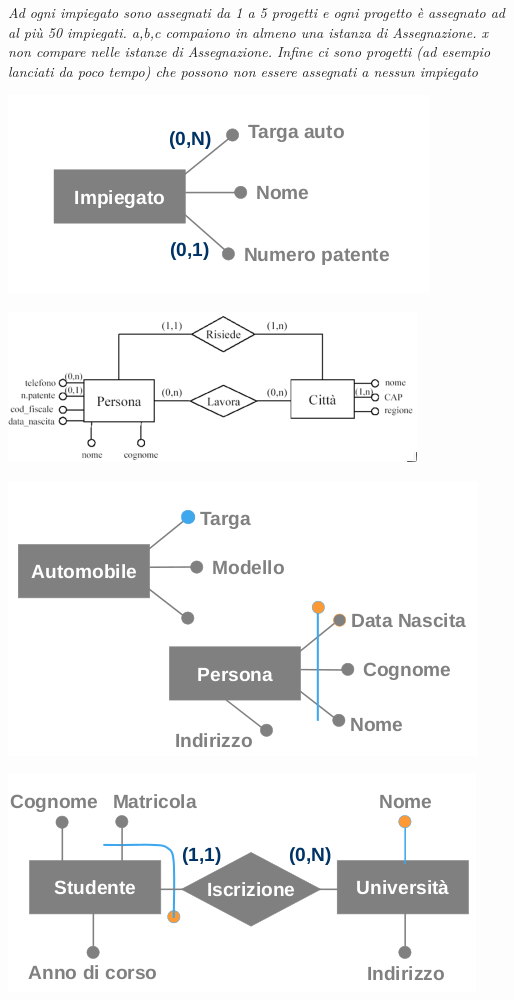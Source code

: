 \documentclass[a4paper,12pt, oneside]{book}
\begin{document}
\textit{Ad ogni impiegato sono assegnati da 1 a 5 progetti e ogni progetto è assegnato ad al più 50 impiegati. a,b,c compaiono in almeno una istanza di Assegnazione. x non compare nelle istanze di Assegnazione. Infine ci sono progetti (ad esempio lanciati da poco
tempo) che possono non essere assegnati a nessun
impiegato}\\
\begin{center}
\includegraphics[scale=0.8]{img/er10.png}
\end{center}
\begin{center}
\includegraphics[scale=0.8]{img/er11.png}
\end{center}
\begin{center}
\includegraphics[scale=0.8]{img/er12.png}
\end{center}
\begin{center}
\includegraphics[scale=0.8]{img/er13.png}
\end{center}
\end{document}
